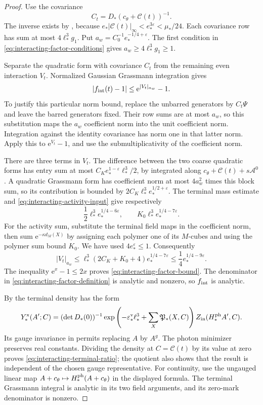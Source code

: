 \begin{proof}
Use the covariance
\[
 C_t=D_*(c_\theta+\mathscr C(t))^{-1}.
\]
The inverse exists by
\cite[(75)]{TerminalPressure}, because
$e_*|\mathscr C(t)|_\infty<e_*^{3\varepsilon}
<\mu_*/24$. Each covariance row has sum at
most $4\ell_*^3g_1$. Put
$a_w=C_0^{-1}e_*^{-1/4+\varepsilon}$.
The first condition in
\eqref{eq:interacting-factor-conditions} gives
$a_w\ge4\ell_*^3g_1\ge1$.

Separate the quadratic form with covariance $C_t$
from the remaining even interaction $V_t$.
Normalized Gaussian Grassmann integration gives
\begin{equation}\label{eq:interacting-crude-Gaussian}
 |f_{\rm int}(t)-1|\le \mathrm e^{|V_t|_{a_w}}-1.
\end{equation}
To justify this particular norm bound, replace
the unbarred generators by $C_t\Psi$ and leave
the barred generators fixed. Their row sums
are at most $a_w$, so this substitution maps
the $a_w$ coefficient norm into the unit
coefficient norm. Integration against the identity
covariance has norm one in that latter norm.
Apply this to $\mathrm e^{V_t}-1$, and use the
submultiplicativity of the coefficient norm.

There are three terms in $V_t$. The difference
between the two coarse quadratic forms has
entry sum at most
$C_Ke_*^{1-\varepsilon}\ell_*^3/2$, by
\cite[(66)]{TerminalPressure} integrated along
$c_\theta+\mathscr C(t)+s\mathscr A^0$.
A quadratic Grassmann form has coefficient norm
at most $4a_w^2$ times this block sum, so
its contribution is bounded by
$2C_K\ell_*^3e_*^{1/2+\varepsilon}$.
The terminal mass estimate and
\eqref{eq:interacting-activity-input} give respectively
\[
 \frac12\ell_*^3e_*^{1/4-6\varepsilon},
 \qquad K_0\ell_*^3e_*^{1/4-7\varepsilon}.
\]
For the activity sum, substitute the terminal
field maps in the coefficient norm, then sum
$\mathrm e^{-\kappa d_M(X)}$ by assigning each polymer
one of its $M$-cubes and using the polymer
sum bound $K_0$. We have used
$4e_*^\varepsilon\le1$.
Consequently
\[
 |V_t|_{a_w}\le
 \ell_*^3(2C_K+K_0+4)e_*^{1/4-7\varepsilon}
 \le\frac14e_*^{1/4-9\varepsilon}.
\]
The inequality $\mathrm e^x-1\le2x$ proves
\eqref{eq:interacting-factor-bound}.
The denominator in \eqref{eq:interacting-factor-definition}
is analytic and nonzero, so $f_{\rm int}$ is analytic.

By \cite[(16)]{TerminalPressure} the terminal density has the form
\[
 Y_*^{\rm x}(A';C)=
 (\det D_*(0))^{-1}
 \exp\left(-\varepsilon_*^{\rm v}\ell_*^3+
                         \sum_X\mathfrak P_*(X,C)\right)
 Z_{\rm in}(H_*^{\rm ph}A',C).
\]
Its gauge invariance in \cite[Theorem~B]{TerminalPressure}
permits replacing $A$ by
$A^g$. The photon minimizer preserves real
constants. Dividing the density at $C=\mathscr C(t)$
by its value at zero proves
\eqref{eq:interacting-terminal-ratio}; the quotient
also shows that the result is independent of
the chosen gauge representative. For continuity,
use the ungauged linear map
$A+c_\theta\mapsto H_*^{\rm ph}(A+c_\theta)$
in the displayed formula. The terminal Grassmann
integral is analytic in its two field arguments,
and its zero-mark denominator is nonzero.


\end{proof}
